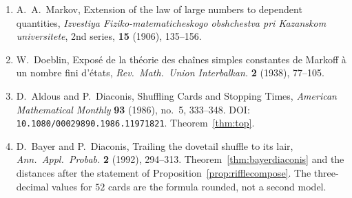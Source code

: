 \begin{enumerate}
\item A.~A.~Markov, Extension of the law of large numbers to dependent quantities, \emph{Izvestiya Fiziko-matematicheskogo obshchestva pri Kazanskom universitete}, 2nd series, \textbf{15} (1906), 135--156.
\item W.~Doeblin, Expos\'e de la th\'eorie des cha\^ines simples constantes de Markoff \`a un nombre fini d'\'etats, \emph{Rev.\ Math.\ Union Interbalkan.} \textbf{2} (1938), 77--105.
\item D.~Aldous and P.~Diaconis, Shuffling Cards and Stopping Times, \emph{American Mathematical Monthly} \textbf{93} (1986), no.~5, 333--348. DOI: \texttt{10.1080/00029890.1986.11971821}. Theorem~\ref{thm:top}.
\item D.~Bayer and P.~Diaconis, Trailing the dovetail shuffle to its lair, \emph{Ann.\ Appl.\ Probab.} \textbf{2} (1992), 294--313. Theorem~\ref{thm:bayerdiaconis} and the distances after the statement of Proposition~\ref{prop:rifflecompose}. The three-decimal values for $52$ cards are the formula rounded, not a second model.
\end{enumerate}

